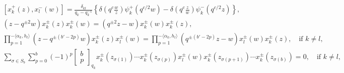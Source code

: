 \documentclass[12pt]{amsart}
\theoremstyle{definition}
\theoremstyle{remark}
\numberwithin{equation}{subsection}
\begin{document}
{\begin{gather}
%
  \left[x_{k}^+(z), x_{l}^-(w)\right] =
  \frac{\delta_{kl}}{q_k  - q_k^{-1}}
  \left\{\delta\left(q^c\frac{w}{z}\right)\psi^+_k(q^{c/2}w) -
        \delta\left(q^c\frac{z}{w}\right)\psi^-_k(q^{c/2}z)\right\},
    \label{eq:relEF}
\\
%
   (z - q^{\pm 2} w) x_{k}^\pm(z) x_{k}^\pm(w)
   = (q^{\pm 2} z - w) x_{k}^\pm(w) x_{k}^\pm(z),
   \label{eq:relexE2}
\\
%
  \prod_{p=1}^{-\langle \alpha_k,h_l\rangle}
   (z - q^{\pm(b'-2p)} w) x_{k}^\pm(z) x_{l}^\pm(w)
 = \prod_{p=1}^{-\langle \alpha_k, h_l\rangle}
   (q^{\pm(b'-2p)} z - w) x_{l}^\pm(w) x_{k}^\pm(z),
   \quad\text{if $k\neq l$},
   \label{eq:relexE1}
\\
%
%
%
%
  \sum_{\sigma\in S_b}
   \sum_{p=0}^{b}(-1)^p 
   \begin{bmatrix} b \\ p\end{bmatrix}_{q_k}
   x_{k}^\pm(z_{\sigma(1)})\cdots x_{k}^\pm(z_{\sigma(p)})
   x_{l}^\pm(w)
   x_{k}^\pm(z_{\sigma(p+1)})\cdots x_{k}^\pm(z_{\sigma(b)}) = 0,
   \quad \text{if $k\neq l$,}
 \label{eq:relDS}

\end{gather}}
\end{document}
